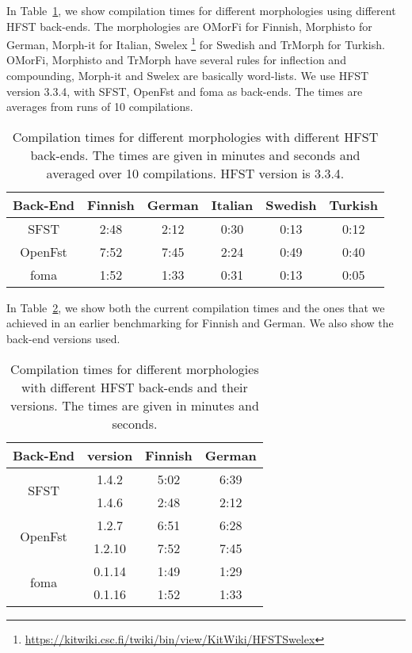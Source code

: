 \documentclass{llncs}
\begin{document}
In Table~\ref{tab:compilation_times}, we show compilation times for different 
morphologies using different HFST back-ends. The morphologies are OMorFi 
\cite{pirinen/2008} for Finnish, Morphisto \cite{zielinski/2009} for German,
Morph-it \cite{Zanchetta/2005} for Italian, Swelex 
\footnote{\url{https://kitwiki.csc.fi/twiki/bin/view/KitWiki/HFSTSwelex}} 
for Swedish and TrMorph \cite{Coltekin/2010} for Turkish. 
OMorFi, Morphisto and TrMorph have several rules for
inflection and compounding, Morph-it and Swelex are basically word-lists.
We use HFST version 3.3.4, with SFST, OpenFst and foma as
back-ends. The times are averages from runs of 10 compilations.

\begin{table} [h!]
  \centering
  \caption{Compilation times for different morphologies with
    different HFST back-ends. The times are given in minutes and seconds
    and averaged over 10 compilations. HFST version is 3.3.4.}
  \begin{tabular}{c c c c c c }
    \hline
    Back-End & Finnish & German & Italian & Swedish & Turkish \\ \hline
    SFST & 2:48 & 2:12 & 0:30 & 0:13 & 0:12 \\
    OpenFst & 7:52 & 7:45 & 2:24 & 0:49 & 0:40 \\
    foma & 1:52 & 1:33 & 0:31 & 0:13 & 0:05 \\ \hline
  \end{tabular}
  \label{tab:compilation_times}
\end{table}


In Table~\ref{tab:compilation_times_versions}, we show both the current compilation 
times and the ones that we achieved in an earlier benchmarking \cite{linden/2011/sfcm} for 
Finnish and German. We also show the back-end versions used.

\begin{table} [h!]
  \centering
  \caption{Compilation times for different morphologies with
    different HFST back-ends and their versions. 
    The times are given in minutes and seconds.}
  \begin{tabular}{ c c c c }
    \hline
    Back-End                 & version  & Finnish  & German \\ \hline
    \multirow{2}{*}{SFST}    & 1.4.2    & 5:02     & 6:39 \\
    & 1.4.6    & 2:48     & 2:12 \\
    \multirow{2}{*}{OpenFst} & 1.2.7    & 6:51     & 6:28 \\
    & 1.2.10   & 7:52     & 7:45 \\
    \multirow{2}{*}{foma}    & 0.1.14   & 1:49     & 1:29 \\
    & 0.1.16   & 1:52     & 1:33 \\
    \hline
  \end{tabular}
  \label{tab:compilation_times_versions}
\end{table}
\end{document}
